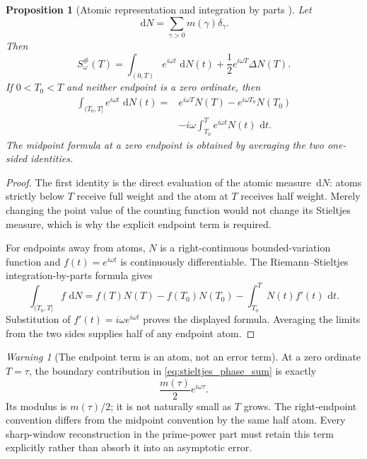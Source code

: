 \documentclass[11pt]{amsart}
\numberwithin{equation}{section}
\theoremstyle{plain}
\newtheorem{proposition}[theorem]{Proposition}
\theoremstyle{definition}
\theoremstyle{remark}
\newtheorem{warning}[theorem]{Warning}
\newcommand{\1}{\mathbf{1}}
\newcommand{\dd}{\,\mathrm{d}}
\begin{document}
\begin{proposition}[Atomic representation and integration by parts {}]
\label{prop:stieltjes_phase_sum}
Let
\begin{equation}
\dd N
=
\sum_{\gamma>0}m(\gamma)\delta_\gamma.
\label{eq:dN_atomic}
\end{equation}
Then
\begin{equation}
\boxed{
S_\omega^{\#}(T)
=
\int_{(0,T)}e^{i\omega t}\,\dd N(t)
+
\frac12e^{i\omega T}\Delta N(T).
}
\label{eq:stieltjes_phase_sum}
\end{equation}
If \(0<T_0<T\) and neither endpoint is a zero ordinate, then
\begin{align}
\int_{(T_0,T]}e^{i\omega t}\,\dd N(t)
={}&
e^{i\omega T}N(T)-e^{i\omega T_0}N(T_0)
\label{eq:stieltjes_integration_by_parts_one}
\\
&-
i\omega\int_{T_0}^{T}e^{i\omega t}N(t)\,\dd t.
\label{eq:stieltjes_integration_by_parts_two}
\end{align}
The midpoint formula at a zero endpoint is obtained by averaging the two
one-sided identities.
\end{proposition}

\begin{proof}
The first identity is the direct evaluation of the atomic measure
\(\dd N\): atoms strictly below \(T\) receive full weight and the atom at
\(T\) receives half weight.  Merely changing the point value of the
counting function would not change its Stieltjes measure, which is why the
explicit endpoint term is required.

For endpoints away from atoms, \(N\) is a right-continuous
bounded-variation function and \(f(t)=e^{i\omega t}\) is continuously
differentiable.  The Riemann--Stieltjes integration-by-parts formula gives
\begin{equation}
\int_{(T_0,T]} f\,\dd N
=
f(T)N(T)-f(T_0)N(T_0)-\int_{T_0}^{T}N(t)f'(t)\,\dd t.
\label{eq:stieltjes_general_ibp}
\end{equation}
Substitution of \(f'(t)=i\omega e^{i\omega t}\) proves the displayed
formula.  Averaging the limits from the two sides supplies half of any
endpoint atom.
\end{proof}

\begin{warning}[The endpoint term is an atom, not an error term]
\label{warn:endpoint_atom_not_small}
At a zero ordinate $T=\tau$, the boundary contribution in
\eqref{eq:stieltjes_phase_sum} is exactly
\begin{equation}
\frac{m(\tau)}2e^{i\omega\tau}.
\label{eq:endpoint_atom_exact_weight}
\end{equation}
Its modulus is $m(\tau)/2$; it is not naturally small as $T$ grows.  The
right-endpoint convention differs from the midpoint convention by the same
half atom.  Every sharp-window reconstruction in the prime-power part must
retain this term explicitly rather than absorb it into an asymptotic error.
\end{warning}
\end{document}

